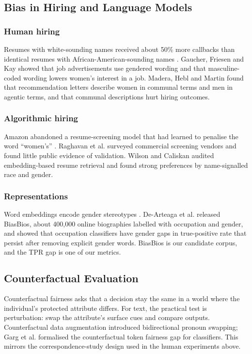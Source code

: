 \documentclass[conference,a4paper]{IEEEtran}
\begin{document}
\subsection{Bias in Hiring and Language Models}
\subsubsection{Human hiring} Resumes with white-sounding names received about 50\% more callbacks than identical resumes with African-American-sounding names \cite{bertrand}. Gaucher, Friesen and Kay \cite{gaucher} showed that job advertisements use gendered wording and that masculine-coded wording lowers women's interest in a job. Madera, Hebl and Martin \cite{madera} found that recommendation letters describe women in communal terms and men in agentic terms, and that communal descriptions hurt hiring outcomes.

\subsubsection{Algorithmic hiring} Amazon abandoned a resume-screening model that had learned to penalise the word ``women's'' \cite{dastin}. Raghavan et al. \cite{raghavan} surveyed commercial screening vendors and found little public evidence of validation. Wilson and Caliskan \cite{wilson} audited embedding-based resume retrieval and found strong preferences by name-signalled race and gender.

\subsubsection{Representations} Word embeddings encode gender stereotypes \cite{bolukbasi}. De-Arteaga et al. \cite{biasbios} released BiasBios, about 400,000 online biographies labelled with occupation and gender, and showed that occupation classifiers have gender gaps in true-positive rate that persist after removing explicit gender words. BiasBios is our candidate corpus, and the TPR gap is one of our metrics.

\subsection{Counterfactual Evaluation}
Counterfactual fairness \cite{kusner} asks that a decision stay the same in a world where the individual's protected attribute differs. For text, the practical test is perturbation: swap the attribute's surface cues and compare outputs. Counterfactual data augmentation \cite{lu,zhao} introduced bidirectional pronoun swapping; Garg et al. \cite{garg} formalised the counterfactual token fairness gap for classifiers. This mirrors the correspondence-study design used in the human experiments above.
\end{document}
